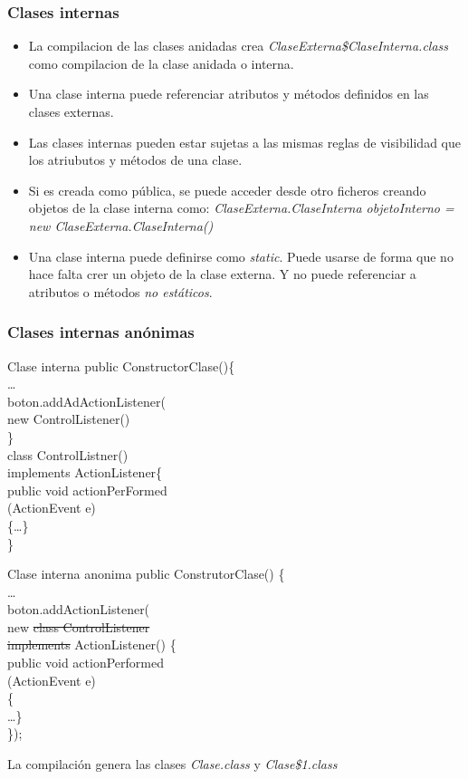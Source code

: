\documentclass{beamer}
\begin{document}
\begin{frame}
    \frametitle{Clases internas}
\begin{itemize}[<+->]
\item La compilacion de las clases anidadas crea \emph{ClaseExterna\$ClaseInterna.class} como compilacion de la clase anidada o interna.
\item Una clase interna puede referenciar atributos y métodos definidos en las clases externas.
\item Las clases internas pueden estar sujetas a las mismas reglas de visibilidad que los atriubutos y métodos de una clase.
\item Si es creada como pública, se puede acceder desde otro ficheros creando objetos de la clase interna como: \emph{ClaseExterna.ClaseInterna objetoInterno = new ClaseExterna.ClaseInterna()}
\item Una clase interna puede definirse como \emph{static}. Puede usarse de forma que no hace falta crer un objeto de la clase externa. Y no puede referenciar a atributos o métodos \emph{no estáticos}.
\end{itemize}
\end{frame}


\begin{frame}[fragile]
    \frametitle{Clases internas anónimas}
    \begin{multicols}{2}
    \begin{block}{Clase interna}
    public ConstructorClase()\{\\
    \dots\\
    boton.addAdActionListener(\\
    new ControlListener()\\
    \}\\
    class ControlListner()\\
    implements ActionListener\{\\
    public void actionPerFormed\\
    (ActionEvent e)\\
    \{\dots\}\\
    \}
    \end{block}
\begin{block}{Clase interna anonima}
    public ConstrutorClase() \{\\
    \dots\\
    boton.addActionListener(\\
new \st{class ControlListener\\
implements} ActionListener() \{\\
public void actionPerformed\\
(ActionEvent e) \\
\{\\\dots\}\\
\});
\end{block}
\end{multicols}
\pause
La compilación genera las clases \emph{Clase.class} y \emph{Clase\$1.class}
\end{frame}
\end{document}
